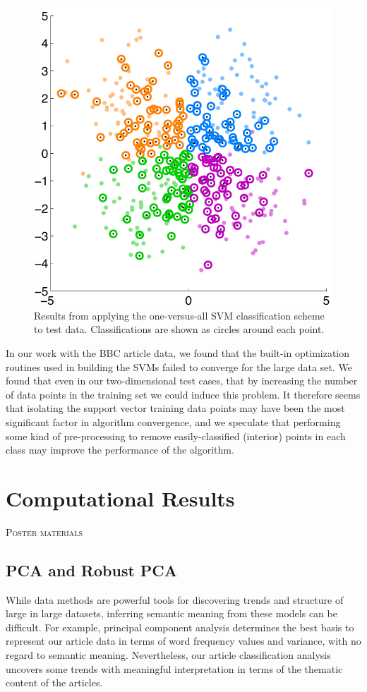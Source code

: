 \documentclass[12pt]{article}
\newcommand{\comment}[1]{\textsc{\color[rgb]{1,0,0}#1}}
\begin{document}
\begin{figure}[H]
\centering
\includegraphics[width=.48\textwidth]{figures/svm_classification}
\caption{Results from applying the one-versus-all SVM classification scheme to test data. Classifications are shown as circles around each point.}
\label{fig:svm_classify}
\end{figure}

In our work with the BBC article data, we found that the built-in optimization routines used in building the SVMs failed to converge for the large data set. We found that even in our two-dimensional test cases, that by increasing the number of data points in the training set we could induce this problem. It therefore seems that isolating the support vector training data points may have been the most significant factor in algorithm convergence, and we speculate that performing some kind of pre-processing to remove easily-classified (interior) points in each class may improve the performance of the algorithm.

\section{Computational Results}
\comment{Poster materials}

\subsection{PCA and Robust PCA}

While data methods are powerful tools for discovering trends and structure of large in large datasets, inferring semantic meaning from these models can be difficult. For example, principal component analysis determines the best basis to represent our
article data in terms of word frequency values and variance, with no regard to semantic meaning. Nevertheless, our article classification analysis uncovers some trends with meaningful interpretation in terms of the thematic content of the articles.
\end{document}
